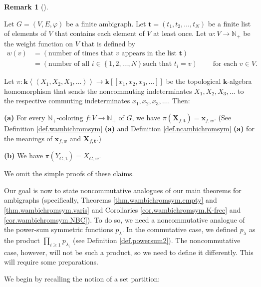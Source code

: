 \documentclass[numbers=enddot,12pt,final,onecolumn,notitlepage]{scrartcl}%
\theoremstyle{definition}
\newtheorem{remk}[theo]{Remark}
\newenvironment{remark}[1][]
{\begin{remk}[#1]\begin{leftbar}}
{\end{leftbar}\end{remk}}
\let\prodnonlimits\prod
\renewcommand{\prod}{\prodnonlimits\limits}
\begin{document}
\begin{remark}
\label{rmk.ncambichromsym.lift}Let $G=\left(  V,E,\varphi\right)  $ be a
finite ambigraph. Let $\mathbf{t}=\left(  t_{1},t_{2},\ldots,t_{N}\right)  $
be a finite list of elements of $V$ that contains each element of $V$ at least
once. Let $w:V\rightarrow\mathbb{N}_{+}$ be the weight function on $V$ that is
defined by%
\begin{align*}
w\left(  v\right)   &  =\left(  \text{number of times that }v\text{ appears in
the list }\mathbf{t}\right) \\
&  =\left(  \text{number of all }i\in\left\{  1,2,\ldots,N\right\}  \text{
such that }t_{i}=v\right)  \ \ \ \ \ \ \ \ \ \ \text{for each }v\in V.
\end{align*}


Let $\pi:\mathbf{k}\left\langle \left\langle X_{1},X_{2},X_{3},\ldots
\right\rangle \right\rangle \rightarrow\mathbf{k}\left[  \left[  x_{1}%
,x_{2},x_{3},\ldots\right]  \right]  $ be the topological $\mathbf{k}$-algebra
homomorphism that sends the noncommuting indeterminates $X_{1},X_{2}%
,X_{3},\ldots$ to the respective commuting indeterminates $x_{1},x_{2}%
,x_{3},\ldots$. Then:

\textbf{(a)} For every $\mathbb{N}_{+}$-coloring $f:V\rightarrow\mathbb{N}%
_{+}$ of $G$, we have $\pi\left(  \mathbf{X}_{f,\mathbf{t}}\right)
=\mathbf{x}_{f,w}$. (See Definition \ref{def.wambichromsym} \textbf{(a)} and
Definition \ref{def.ncambichromsym} \textbf{(a)} for the meanings of
$\mathbf{x}_{f,w}$ and $\mathbf{X}_{f,\mathbf{t}}$.)

\textbf{(b)} We have $\pi\left(  Y_{G,\mathbf{t}}\right)  =X_{G,w}$.
\end{remark}

We omit the simple proofs of these claims.

Our goal is now to state noncommutative analogues of our main theorems for
ambigraphs (specifically, Theorems \ref{thm.wambichromsym.empty} and
\ref{thm.wambichromsym.varis} and Corollaries \ref{cor.wambichromsym.K-free}
and \ref{cor.wambichromsym.NBC}). To do so, we need a noncommutative analogue
of the power-sum symmetric functions $p_{\lambda}$. In the commutative case,
we defined $p_{\lambda}$ as the product $\prod_{i\geq1}p_{\lambda_{i}}$ (see
Definition \ref{def.powersum2}). The noncommutative case, however, will not be
such a product, so we need to define it differently. This will require some preparations.

We begin by recalling the notion of a set partition:
\end{document}
